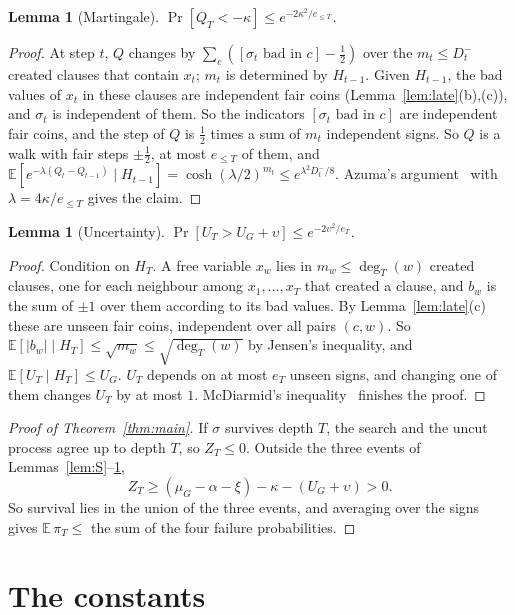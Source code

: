\documentclass[11pt,a4paper]{article}
\newtheorem{lemma}[theorem]{Lemma}
\theoremstyle{remark}
\newcommand{\E}{\mathbb{E}}
\begin{document}
\begin{lemma}[Martingale]\label{lem:Q}
$\Pr[Q_T<-\kappa]\le e^{-2\kappa^2/e_{\le T}}$.
\end{lemma}

\begin{proof}
At step $t$, $Q$ changes by $\sum_c([\sigma_t\text{ bad in }c]-\frac12)$ over
the $m_t\le D^-_t$ created clauses that contain $x_t$; $m_t$ is determined by
$H_{t-1}$. Given $H_{t-1}$, the bad values of $x_t$ in these clauses are
independent fair coins (Lemma~\ref{lem:late}(b),(c)), and $\sigma_t$ is
independent of them. So the indicators $[\sigma_t\text{ bad in }c]$ are
independent fair coins, and the step of $Q$ is $\frac12$ times a sum of $m_t$
independent signs. So $Q$ is a walk with fair steps $\pm\frac12$, at most
$e_{\le T}$ of them, and
$\E[e^{-\lambda(Q_t-Q_{t-1})}\mid H_{t-1}]=\cosh(\lambda/2)^{m_t}\le
e^{\lambda^2D^-_t/8}$. Azuma's argument~\cite{Azu67,Hoe63} with
$\lambda=4\kappa/e_{\le T}$ gives the claim.
\end{proof}

\begin{lemma}[Uncertainty]\label{lem:U}
$\Pr[U_T>U_G+\upsilon]\le e^{-2\upsilon^2/e_T}$.
\end{lemma}

\begin{proof}
Condition on $H_T$. A free variable $x_w$ lies in $m_w\le\deg_T(w)$ created
clauses, one for each neighbour among $x_1,\dots,x_T$ that created a clause,
and $b_w$ is the sum of $\pm1$ over them according to its bad values. By
Lemma~\ref{lem:late}(c) these are unseen fair coins, independent over all
pairs $(c,w)$. So $\E[|b_w|\mid H_T]\le\sqrt{m_w}\le\sqrt{\deg_T(w)}$ by
Jensen's inequality, and $\E[U_T\mid H_T]\le U_G$. $U_T$ depends on at most
$e_T$ unseen signs, and changing one of them changes $U_T$ by at most $1$.
McDiarmid's inequality~\cite{McD89} finishes the proof.
\end{proof}

\begin{proof}[Proof of Theorem~\ref{thm:main}]
If $\sigma$ survives depth $T$, the search and the uncut process agree up to
depth $T$, so $Z_T\le0$. Outside the three events of
Lemmas~\ref{lem:S}--\ref{lem:U},
\[
 Z_T\ge(\mu_G-\alpha-\xi)-\kappa-(U_G+\upsilon)>0 .
\]
So survival lies in the union of the three events, and averaging over the
signs gives $\E\,\pi_T\le$ the sum of the four failure probabilities.
\end{proof}

\section{The constants}\label{sec:constants}
\end{document}
